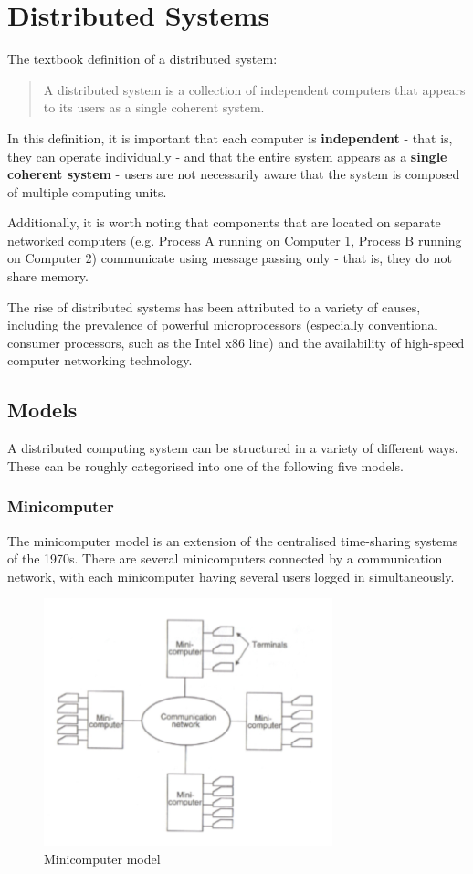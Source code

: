 \section{Distributed Systems}
The textbook definition of a distributed system:
\begin{quote}
A distributed system is a collection of independent computers that appears to its users as a single coherent system.
\end{quote}

In this definition, it is important that each computer is \textbf{independent} - that is, they can operate individually - and that the entire system appears as a \textbf{single coherent system} - users are not necessarily aware that the system is composed of multiple computing units.

Additionally, it is worth noting that components that are located on separate networked computers (e.g. Process A running on Computer 1, Process B running on Computer 2) communicate using message passing only - that is, they do not share memory.

The rise of distributed systems has been attributed to a variety of causes, including the prevalence of powerful microprocessors (especially conventional consumer processors, such as the Intel x86 line) and the availability of high-speed computer networking technology.

\subsection{Models}
A distributed computing system can be structured in a variety of different ways. These can be roughly categorised into one of the following five models.

\subsubsection{Minicomputer}
The minicomputer model is an extension of the centralised time-sharing systems of the 1970s. There are several minicomputers connected by a communication network, with each minicomputer having several users logged in simultaneously.

\begin{figure}[h]
\centering
\includegraphics[width=0.5\linewidth]{figures/screenshot003}
\caption{Minicomputer model}
\label{fig:screenshot003}
\end{figure}

